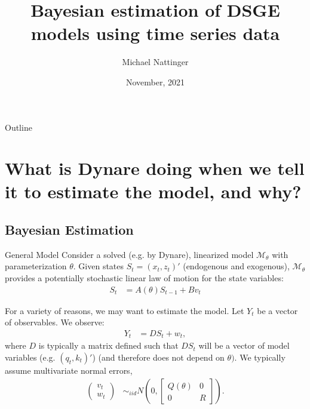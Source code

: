 \documentclass{beamer}
\title%
{Bayesian estimation of DSGE models using time series data}
\author %
{Michael Nattinger}
\date %
{November, 2021}
\begin{document}
\begin{frame}
  \titlepage
\end{frame}

\begin{frame}{Outline}
  \tiny{\tableofcontents}
\end{frame}




\section{What is Dynare doing when we tell it to estimate the model, and why?}

\subsection{Bayesian Estimation}

\begin{frame}{General Model}
Consider a solved (e.g. by Dynare), linearized model $\mathcal{M}_{\theta}$ with parameterization $\theta.$ Given states $S_t = (x_t, z_t)'$ (endogenous and exogenous),  $\mathcal{M}_{\theta}$ provides a potentially stochastic linear law of motion for the state variables:
\begin{align}
S_t &= A(\theta) S_{t-1} + B v_t\label{state} \tag{Transition}
\end{align}

For a variety of reasons, we may want to estimate the model. Let $Y_t$ be a vector of observables. We observe:
\begin{align}
Y_t &= D S_{t} +  w_t\label{meas} \tag{Measurement},
\end{align}
where $D$ is typically a matrix defined such that $DS_t$ will be a vector of model variables (e.g. $(q_t, k_t)'$) (and therefore does not depend on $\theta).$ We typically assume multivariate normal errors,
\begin{align*}
\begin{pmatrix} v_t \\ w_t \end{pmatrix} &\sim_{iid} N\left(0,\begin{bmatrix} Q(\theta) & 0 \\ 0 & R \end{bmatrix} \right).
\end{align*}
\end{frame}
\end{document}
